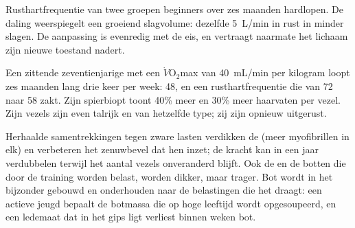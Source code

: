 \begin{omfigure}

{\small Rusthartfrequentie van twee groepen beginners over zes maanden
hardlopen. De daling weerspiegelt een groeiend slagvolume: dezelfde
\qty{5}{L/min} in rust in minder slagen. De aanpassing is evenredig met
de eis, en vertraagt naarmate het lichaam zijn nieuwe toestand nadert.}
\end{omfigure}

\begin{example}\label{ex:g10:sport-and-health:numbers}
Een zittende zeventienjarige met een $\dot V\!\mathrm{O_2}$max van
\qty{40}{mL/min} per kilogram loopt zes maanden lang drie keer per week:
\num{48}, en een rusthartfrequentie die van 72 naar 58 zakt. Zijn
spierbiopt toont 40\% meer  en 30\% meer haarvaten per
vezel. Zijn vezels zijn even talrijk en van hetzelfde type; zij zijn
opnieuw uitgerust.
\end{example}

\begin{proposition}\label{prop:g10:sport-and-health:strength}
Herhaalde samentrekkingen tegen zware lasten verdikken de 
(meer myofibrillen in elk) en verbeteren het zenuwbevel dat hen inzet;
de kracht kan in een jaar verdubbelen terwijl het aantal vezels
onveranderd blijft. Ook de  en de botten die door de training worden
belast, worden dikker, maar trager. Bot wordt in het bijzonder gebouwd en
onderhouden naar de belastingen die het draagt: een actieve jeugd bepaalt
de botmassa die op hoge leeftijd wordt opgesoupeerd, en een ledemaat dat
in het gips ligt verliest binnen weken bot.
\end{proposition}
\admitted

